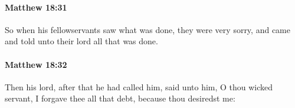 		\paragraph{Matthew 18:31} %
			\label{MATTHEW-18-31}

			So when his fellowservants saw what was done, they were very sorry, and came and told unto their lord all that was done.

			\begin{framed}
			\scriptsize
				\begin{compactdesc}
					\item[SBLG] 
				\end{compactdesc}
			\end{framed}

		\paragraph{Matthew 18:32} %
			\label{MATTHEW-18-32}

			Then his lord, after that he had called him, said unto him, O thou wicked servant, I forgave thee all that debt, because thou desiredst me:

